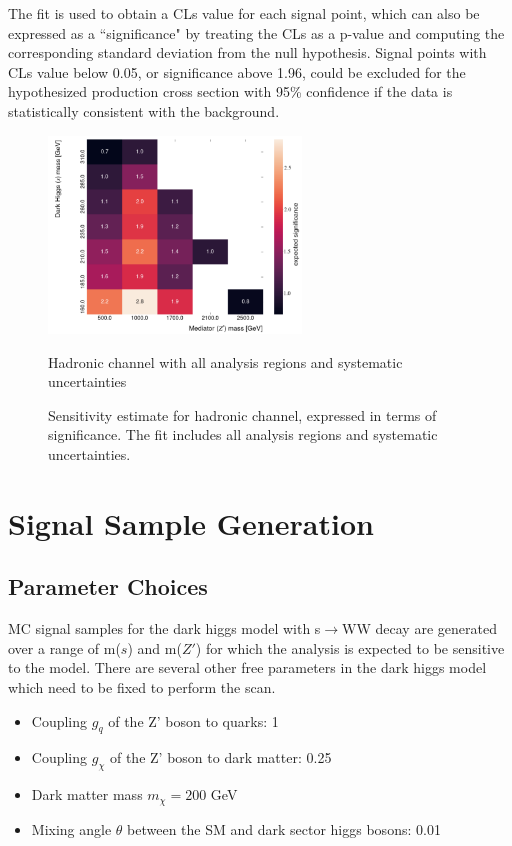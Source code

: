 \documentclass[12pt]{article}
\begin{document}
The fit is used to obtain a CLs value \cite{PDG_stats} for each signal point, which can also be expressed as a ``significance" by treating the CLs as a p-value and computing the corresponding standard deviation from the null hypothesis. Signal points with CLs value below 0.05, or significance above 1.96, could be excluded for the hypothesized production cross section with 95\% confidence if the data is statistically consistent with the background. 

\begin{figure}[H]
     \centering
     \includegraphics[width=0.6\textwidth]{figures/had_sensitivity.png}
     \caption[]{Hadronic channel with all analysis regions and systematic uncertainties}
\caption[]{Sensitivity estimate for hadronic channel, expressed in terms of significance. The fit includes all analysis regions and systematic uncertainties.}
\label{fig:sensitivity}
\end{figure}

\section{Signal Sample Generation}

\subsection{Parameter Choices}

MC signal samples for the dark higgs model with s$\rightarrow$WW decay are generated over a range of m($s$) and m($Z'$) for which the analysis is expected to be sensitive to the model. There are several other free parameters in the dark higgs model which need to be fixed to perform the scan. 

\begin{itemize}
	\item Coupling $g_{q}$ of the Z' boson to quarks: 1 
	\item Coupling $g_{\chi}$ of the Z' boson to dark matter: 0.25
	\item Dark matter mass $m_{\chi} = 200$ GeV
	\item Mixing angle $\theta$ between the SM and dark sector higgs bosons: 0.01
\end{itemize}
\end{document}
